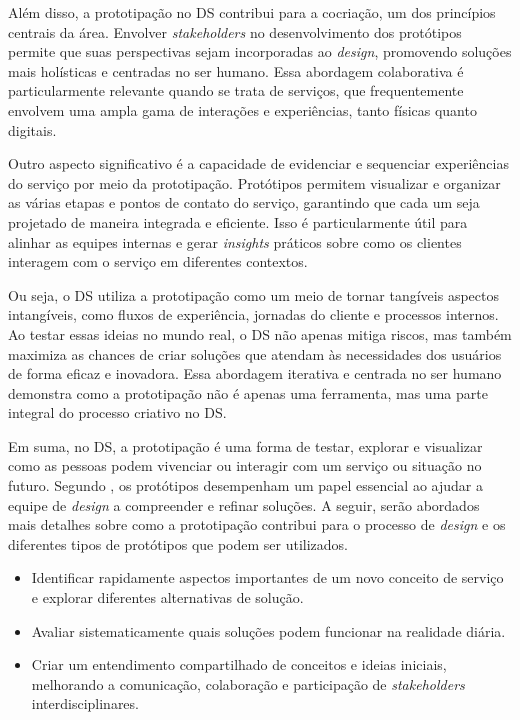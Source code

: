 Além disso, a prototipação no DS contribui para a cocriação, um dos princípios centrais da área. Envolver \textit{stakeholders} no desenvolvimento dos protótipos permite que suas perspectivas sejam incorporadas ao \textit{design}, promovendo soluções mais holísticas e centradas no ser humano. Essa abordagem colaborativa é particularmente relevante quando se trata de serviços, que frequentemente envolvem uma ampla gama de interações e experiências, tanto físicas quanto digitais.

Outro aspecto significativo é a capacidade de evidenciar e sequenciar experiências do serviço por meio da prototipação. Protótipos permitem visualizar e organizar as várias etapas e pontos de contato do serviço, garantindo que cada um seja projetado de maneira integrada e eficiente. Isso é particularmente útil para alinhar as equipes internas e gerar \textit{insights} práticos sobre como os clientes interagem com o serviço em diferentes contextos.

Ou seja, o DS utiliza a prototipação como um meio de tornar tangíveis aspectos intangíveis, como fluxos de experiência, jornadas do cliente e processos internos. Ao testar essas ideias no mundo real, o DS não apenas mitiga riscos, mas também maximiza as chances de criar soluções que atendam às necessidades dos usuários de forma eficaz e inovadora. Essa abordagem iterativa e centrada no ser humano demonstra como a prototipação não é apenas uma ferramenta, mas uma parte integral do processo criativo no DS.

Em suma, no DS, a prototipação é uma forma de testar, explorar e visualizar como as pessoas podem vivenciar ou interagir com um serviço ou situação no futuro. Segundo \cite{Stickdorn2019}, os protótipos desempenham um papel essencial ao ajudar a equipe de \textit{design} a compreender e refinar soluções. A seguir, serão abordados mais detalhes sobre como a prototipação contribui para o processo de \textit{design} e os diferentes tipos de protótipos que podem ser utilizados.

\begin{itemize}
	\item Identificar rapidamente aspectos importantes de um novo conceito de serviço e explorar diferentes alternativas de solução.
	\item Avaliar sistematicamente quais soluções podem funcionar na realidade diária.
	\item Criar um entendimento compartilhado de conceitos e ideias iniciais, melhorando a comunicação, colaboração e participação de \textit{stakeholders} interdisciplinares.
\end{itemize}

